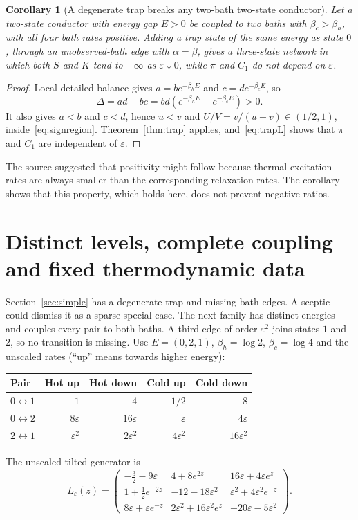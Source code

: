 \documentclass[11pt,a4paper]{article}
\newtheorem{corollary}[theorem]{Corollary}
\theoremstyle{remark}\newtheorem{remark}[theorem]{Remark}
\newcommand{\eps}{\varepsilon}
\begin{document}
\begin{corollary}[A degenerate trap breaks any two-bath two-state conductor]\label{cor:trap}
Let a two-state conductor with energy gap $E>0$ be coupled to two baths with $\beta_c>\beta_h$, with all four bath rates positive. Adding a trap state of the same energy as state $0$, through an unobserved-bath edge with $\alpha=\beta$, gives a three-state network in which both $S$ and $K$ tend to $-\infty$ as $\eps\downarrow0$, while $\pi$ and $C_1$ do not depend on $\eps$.
\end{corollary}
\begin{proof}
Local detailed balance gives $a=be^{-\beta_hE}$ and $c=de^{-\beta_cE}$, so
\begin{equation}
\Delta=ad-bc=bd\left(e^{-\beta_hE}-e^{-\beta_cE}\right)>0 .
\end{equation}
It also gives $a<b$ and $c<d$, hence $u<v$ and $U/V=v/(u+v)\in(1/2,1)$, inside~\eqref{eq:signregion}. Theorem~\ref{thm:trap} applies, and~\eqref{eq:trapL} shows that $\pi$ and $C_1$ are independent of $\eps$.
\end{proof}
The source suggested that positivity might follow because thermal excitation rates are always smaller than the corresponding relaxation rates. The corollary shows that this property, which holds here, does not prevent negative ratios.

\section{Distinct levels, complete coupling and fixed thermodynamic data}\label{sec:full}
Section~\ref{sec:simple} has a degenerate trap and missing bath edges. A sceptic could dismiss it as a sparse special case. The next family has distinct energies and couples every pair to both baths. A third edge of order $\eps^2$ joins states $1$ and $2$, so no transition is missing. Use $E=(0,2,1)$, $\beta_h=\log2$, $\beta_c=\log4$ and the unscaled rates (``up'' means towards higher energy):
\begin{center}
\begin{tabular}{lrrrr}
\toprule
Pair & Hot up & Hot down & Cold up & Cold down\\
\midrule
$0\leftrightarrow1$ & $1$ & $4$ & $1/2$ & $8$\\
$0\leftrightarrow2$ & $8\eps$ & $16\eps$ & $\eps$ & $4\eps$\\
$2\leftrightarrow1$ & $\eps^2$ & $2\eps^2$ & $4\eps^2$ & $16\eps^2$\\
\bottomrule
\end{tabular}
\end{center}
The unscaled tilted generator is
\begin{equation}\label{eq:fullgenerator}
L_\eps(z)=\begin{pmatrix}
-\frac32-9\eps &4+8e^{2z}&16\eps+4\eps e^z\\
1+\frac12e^{-2z}&-12-18\eps^2&\eps^2+4\eps^2e^{-z}\\
8\eps+\eps e^{-z}&2\eps^2+16\eps^2e^z&-20\eps-5\eps^2
\end{pmatrix}.
\end{equation}
\end{document}
